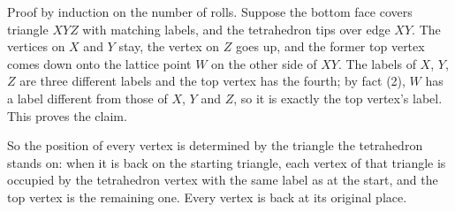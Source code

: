 Proof by induction on the number of rolls. Suppose the bottom face covers triangle $XYZ$ with matching labels, and the tetrahedron tips over edge $XY$. The vertices on $X$ and $Y$ stay, the vertex on $Z$ goes up, and the former top vertex comes down onto the lattice point $W$ on the other side of $XY$. The labels of $X$, $Y$, $Z$ are three different labels and the top vertex has the fourth; by fact (2), $W$ has a label different from those of $X$, $Y$ and $Z$, so it is exactly the top vertex's label. This proves the claim.

So the position of every vertex is determined by the triangle the tetrahedron stands on: when it is back on the starting triangle, each vertex of that triangle is occupied by the tetrahedron vertex with the same label as at the start, and the top vertex is the remaining one. Every vertex is back at its original place.

